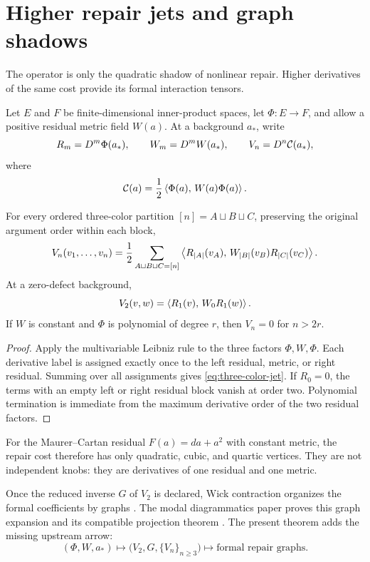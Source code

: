 \documentclass[11pt,a4paper]{article}
\begin{document}
\section{Higher repair jets and graph shadows}
\label{sec:graphs}

The operator is only the quadratic shadow of nonlinear repair.  Higher
derivatives of the same cost provide its formal interaction tensors.

Let \(E\) and \(F\) be finite-dimensional inner-product spaces, let
\(\Phi:E\to F\), and allow a positive residual metric field \(W(a)\).  At a
background \(a_*\), write
\[
R_m=D^m\Phi(a_*),
\qquad
W_m=D^mW(a_*),
\qquad
V_n=D^n\mathcal{C}(a_*),
\]
where
\[
\mathcal{C}(a)=\frac12\left\langle \Phi(a),\,W(a)\Phi(a) \right\rangle.
\]

\begin{theorem}
\label{thm:repair-jet}
For every ordered three-color partition
\([n]=A\sqcup B\sqcup C\), preserving the original argument order within
each block,
\begin{equation}
V_n(v_1,\ldots,v_n)
=\frac12\sum_{A\sqcup B\sqcup C=[n]}
\left\langle R_{|A|}(v_A),\,W_{|B|}(v_B)R_{|C|}(v_C) \right\rangle.
\label{eq:three-color-jet}
\end{equation}
At a zero-defect background,
\[
V_2(v,w)=\left\langle R_1(v),\,W_0R_1(w) \right\rangle.
\]
If \(W\) is constant and \(\Phi\) is polynomial of degree \(r\), then
\(V_n=0\) for \(n>2r\).
\end{theorem}

\begin{proof}
Apply the multivariable Leibniz rule to the three factors
\(\Phi,W,\Phi\).  Each derivative label is assigned exactly once to the
left residual, metric, or right residual.  Summing over all assignments
gives \eqref{eq:three-color-jet}.  If \(R_0=0\), the terms with an empty
left or right residual block vanish at order two.  Polynomial termination
is immediate from the maximum derivative order of the two residual factors.
\end{proof}

For the Maurer--Cartan residual \(F(a)=da+a^2\) with constant metric, the
repair cost therefore has only quadratic, cubic, and quartic vertices.  They
are not independent knobs: they are derivatives of one residual and one
metric.

Once the reduced inverse \(G\) of \(V_2\) is declared, Wick contraction
organizes the formal coefficients by graphs \cite{Wick1950}.  The modal
diagrammatics paper proves this graph expansion and its compatible
projection theorem \cite{MTTDiagrammatics2026}.  The present theorem adds the
missing upstream arrow:
\[
(\Phi,W,a_*)
\longmapsto
\bigl(V_2,G,\{V_n\}_{n\geq3}\bigr)
\longmapsto
\text{formal repair graphs}.
\]
\end{document}
